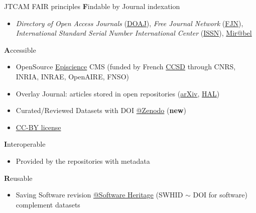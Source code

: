 \documentclass[10pt,compress,serif,aspectratio=169]{beamer}
\begin{document}
\begin{frame}[t]{JTCAM FAIR principles}
  \textbf{F}indable by Journal indexation
  \begin{itemize}
  \item \textit{Directory of Open Access Journals} (\href{https://doaj.org/}{DOAJ}), \textit{Free Journal Network} (\href{https://freejournals.org/}{FJN}), \textit{International Standard Serial Number International Center} (\href{https://www.issn.org/}{ISSN}), \href{https://reseau-mirabel.info/}{Mir@bel}
  \end{itemize}
\vfill
  \textbf{A}ccessible
  \begin{itemize}
  \item OpenSource \href{https://www.episciences.org/}{Episcience} CMS (funded by French \href{https://www.ccsd.cnrs.fr/}{CCSD} through CNRS, INRIA, INRAE, OpenAIRE, FNSO)  
  \item Overlay Journal: articles stored in open repositories (\href{https://arxiv.org/}{arXiv}, \href{https://hal.science/}{HAL})
  \item Curated/Reviewed Datasets with DOI \href{https://zenodo.org/}{@Zenodo} (\textbf{new})
  \item \href{https://creativecommons.org/share-your-work/cclicenses/}{CC-BY license} 
  \end{itemize}
  \vfill
  \textbf{I}nteroperable
  \begin{itemize}
  \item Provided by the repositories with metadata
  \end{itemize}
\vfill
  \textbf{R}eusable
  \begin{itemize}
  \item Saving Software revision \href{https://www.softwareheritage.org/}{@Software Heritage} (SWHID $\sim$ DOI for software) complement datasets  
  \end{itemize}
 
\end{frame}
 

\begin{frame}[t]%
 \vskip1cm%
 \begin{center}%
 \end{center}%
\end{frame}
 
\end{document}
